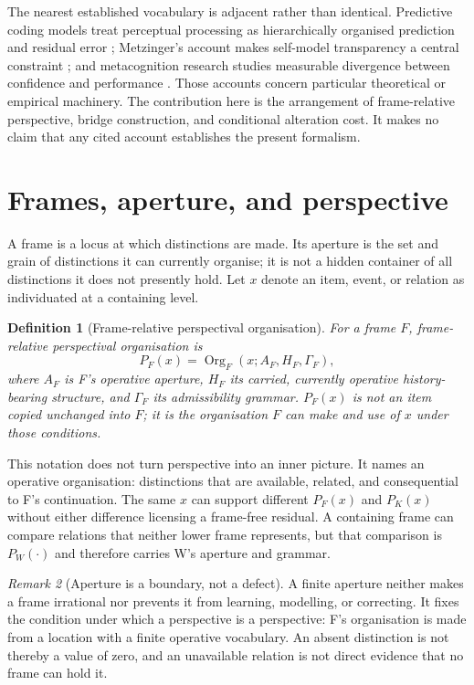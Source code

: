 \documentclass[11pt,a4paper]{article}
\newtheorem{definition}{Definition}[section]
\theoremstyle{remark}
\newtheorem{remark}[definition]{Remark}
\begin{document}
The nearest established vocabulary is adjacent rather than identical. Predictive
coding models treat perceptual processing as hierarchically organised prediction
and residual error \citep{raoballard1999,friston2010}; Metzinger's account makes
self-model transparency a central constraint \citep{metzinger2003,metzinger2020};
and metacognition research studies measurable divergence between confidence and
performance \citep{fleming2024}. Those accounts concern particular theoretical or
empirical machinery. The contribution here is the arrangement of frame-relative
perspective, bridge construction, and conditional alteration cost. It makes no
claim that any cited account establishes the present formalism.

\section{Frames, aperture, and perspective}\label{sec:frames}
A frame is a locus at which distinctions are made. Its aperture is the set and
grain of distinctions it can currently organise; it is not a hidden container of
all distinctions it does not presently hold. Let $x$ denote an item, event, or
relation as individuated at a containing level.

\begin{definition}[Frame-relative perspectival organisation]
For a frame $F$, \emph{frame-relative perspectival organisation} is
\[
 P_F(x)=\operatorname{Org}_F(x;A_F,H_F,\Gamma_F),
\]
where $A_F$ is F's operative aperture, $H_F$ its carried, currently operative
history-bearing structure, and $\Gamma_F$ its admissibility grammar. $P_F(x)$ is
not an item copied unchanged into $F$; it is the organisation $F$ can make and
use of $x$ under those conditions.
\end{definition}

This notation does not turn perspective into an inner picture. It names an
operative organisation: distinctions that are available, related, and
consequential to F's continuation. The same $x$ can support different $P_F(x)$
and $P_K(x)$ without either difference licensing a frame-free residual. A
containing frame can compare relations that neither lower frame represents, but
that comparison is $P_W(\cdot)$ and therefore carries W's aperture and grammar.

\begin{remark}[Aperture is a boundary, not a defect]
A finite aperture neither makes a frame irrational nor prevents it from learning,
modelling, or correcting. It fixes the condition under which a perspective is a
perspective: F's organisation is made from a location with a finite operative
vocabulary. An absent distinction is not thereby a value of zero, and an
unavailable relation is not direct evidence that no frame can hold it.
\end{remark}
\end{document}
